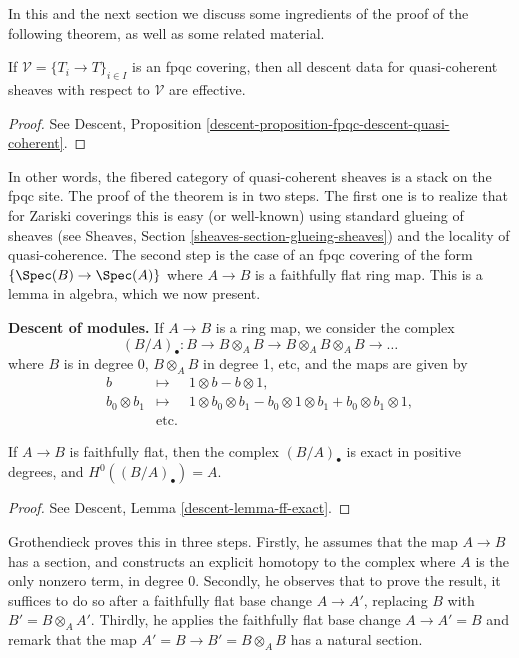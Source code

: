 \noindent
In this and the next section we discuss some ingredients of the proof
of the following theorem, as well as some related material.

\begin{theorem}
\label{theorem-descent-quasi-coherent}
If $\mathcal{V} = \{T_i \to T\}_{i\in I}$ is an fpqc covering, then all
descent data for quasi-coherent sheaves with respect to $\mathcal{V}$
are effective.
\end{theorem}

\begin{proof}
See
Descent, Proposition \ref{descent-proposition-fpqc-descent-quasi-coherent}.
\end{proof}

\noindent
In other words, the fibered category of quasi-coherent sheaves is a stack on
the fpqc site.
The proof of the theorem is in two steps. The first one is to realize that for
Zariski coverings this is easy (or well-known) using standard glueing of
sheaves (see
Sheaves, Section \ref{sheaves-section-glueing-sheaves})
and the locality of quasi-coherence. The second step is the case of an
fpqc covering of the form $\{\Spec(B) \to \Spec(A)\}$
where $A \to B$ is a faithfully flat ring map.
This is a lemma in algebra, which we now present.

\medskip\noindent
{\bf Descent of modules.}
If $A \to B$ is a ring map, we consider the complex
$$
(B/A)_\bullet : B \to B \otimes_A B \to B \otimes_A B \otimes_A B \to \ldots
$$
where $B$ is in degree 0, $B \otimes_A B$ in degree 1, etc, and the maps are
given by
\begin{eqnarray*}
b & \mapsto & 1 \otimes b - b \otimes 1, \\
b_0 \otimes b_1 & \mapsto & 1 \otimes b_0 \otimes b_1 - b_0 \otimes 1 \otimes
b_1 + b_0 \otimes b_1 \otimes 1, \\
& \text{etc.}
\end{eqnarray*}

\begin{lemma}
\label{lemma-algebra-descent}
If $A \to B$ is faithfully flat, then the complex $(B/A)_\bullet$ is exact in
positive degrees, and $H^0((B/A)_\bullet) = A$.
\end{lemma}

\begin{proof}
See Descent, Lemma \ref{descent-lemma-ff-exact}.
\end{proof}

\noindent
Grothendieck proves this in three steps. Firstly, he assumes that the map $A
\to B$ has a section, and constructs an explicit homotopy to the complex where
$A$ is the only nonzero term, in degree 0. Secondly, he observes that to prove
the result, it suffices to do so after a faithfully flat base change $A \to
A'$, replacing $B$ with $B' = B \otimes_A A'$. Thirdly, he applies the
faithfully flat base change $A \to A' = B$ and remark that the map
$A' = B \to B' = B \otimes_A B$ has a natural section.

